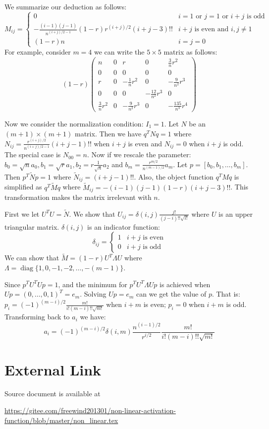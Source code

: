 \documentclass{article}
\DeclareMathOperator*{\diag}{diag}
\begin{document}
We summarize our deduction as follows:
\begin{equation}
M_{ij} = \begin{cases} 0 & i=1 \textrm{ or } j=1 \textrm{ or } i + j \textrm{ is odd} \\
 -\frac{(i-1)(j-1)}{n^{(i+j)/2-1}} (1-r)r^{(i+j)/ 2 } (i+j-3)!! & i+j \textrm{ is even and } i,j \neq 1 \\
(1-r)n & i=j=0
\end{cases}
\end{equation}
For example, consider $m = 4$ we can write the $ 5 \times 5 $ matrix as follows:
$$
(1-r)\begin{pmatrix}
n & 0 & r  & 0 & \frac{3}{n}r^2\\
0 & 0 & 0  & 0 & 0\\
r &  0 & -\frac{1}{n} r^2 & 0 & -\frac{9}{n^2} r^3 \\
0 & 0 & 0 & -\frac{12}{n^2}r^3 & 0 \\
\frac{3}{n}r^2 & 0 & -\frac{9}{n^2} r^3 & 0 & -\frac{135}{n^3}r^4 
\end{pmatrix}
$$

Now we consider the normalization condition: $I_1 = 1$. Let $N$ be an $(m+1) \times (m+1)$ matrix.
Then we have $q^T N q = 1$ where $N_{ij} = \frac{r^{(i+j) / 2}}{n^{(i+j)/2 -1}} (i+j -1)!!$ when $i+j$ is even and $N_{ij} = 0$ when $i+j$ is odd. The special case is $N_{00} = n$. Now if we rescale the parameter: $b_0 = \sqrt{n} a_0, b_1 = \sqrt{r} a_1, b_2 = r \frac{1}{\sqrt{n}} a_2$ and $b_m = \frac{r^{m/2}}{n^{(m-1)/2}} a_m$. Let $p = [b_0, b_1, \dots, b_m]$. Then $p^T \widetilde{N} p =1$ where $\widetilde{N}_{ij} =  (i+j -1)!!$. Also, the object function $q^T M q$ is simplified as $q^T \widetilde{M} q$ where $\widetilde{M}_{ij} =  -(i-1)(j-1)(1-r) (i+j-3)!! $. This transformation makes the matrix irrelevant with $n$.

First we let $U^T U = \widetilde{N}$. We show that $U_{ij} = \delta(i,j)\frac{j!}{(j-i)!!\sqrt{i!}}$ where $U$ is an upper triangular matrix. $\delta(i,j)$ is an indicator function:
\begin{equation}
\delta_{ij} = \begin{cases}
1 & i+j \textrm{ is even} \\
0 & i+j \textrm{ is odd}
\end{cases}
\end{equation}
We can show that $\widetilde{M} = (1-r)U^T \Lambda U$ where $\Lambda = \diag\{1,0, -1, -2, \dots, -(m-1)\}$.

Since $p^T U^T U p = 1$, and the minimum for $p^T U^T \Lambda U p $ is achieved when $U p = (0, \dots, 0, 1)^T = e_m$. Solving $ U p = e_m $ can we get the value of $p$. That is: $p_i = (-1)^{(m-i)/2} \frac{m!}{i!(m-i)!! \sqrt{m!}} $ when $i+m$ is even; $p_i = 0 $ when $i+m$ is odd. Transforming back to $a_i$ we have:
\begin{equation}
a_i =(-1)^{(m-i)/2} \delta(i,m) \frac{n^{(i-1)/2}}{r^{i/2}} \frac{m!}{i!(m-i)!! \sqrt{m!}}
\end{equation}
\section{External Link}
Source document is available at 

\url{https://gitee.com/freewind201301/non-linear-activation-function/blob/master/non_linear.tex}
\end{document}
